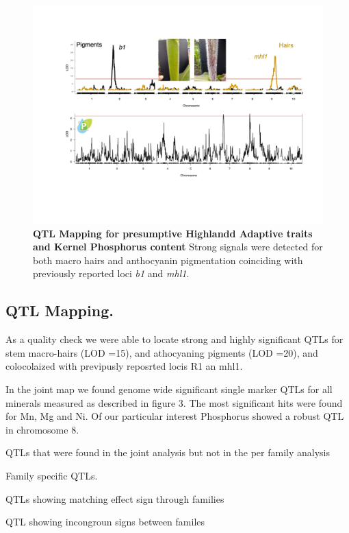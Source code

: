 \clearpage
\begin{figure}[!ht]
\includegraphics[width=0.8\paperwidth]{Chapter-3/figs/fig-28d.pdf}
\caption{\textbf{QTL Mapping for presumptive Highlandd Adaptive traits and Kernel Phosphorus content} Strong signals were detected for both macro hairs and anthocyanin pigmentation coinciding with previously reported loci \textit{b1} and  \textit{mhl1}.
}
\label{Fig3.1}
\end{figure}
\clearpage

\subsection{QTL Mapping.}
As a quality check we were able to locate strong and highly significant QTLs for stem macro-hairs (LOD =15), and  athocyaning pigments (LOD =20), and colocolaized with previpusly reposrted locis R1 an mhl1.

In the joint map we found genome wide significant single marker QTLs for all minerals measured as described in figure 3. The most significant hits were found for Mn, Mg and Ni.  Of our particular interest Phosphorus showed a robust QTL in chromosome 8.

QTLs that were found in the joint analysis but not in the per family analysis

Family specific QTLs.

QTLs  showing matching  effect sign through families

QTL showing incongroun signs between familes


